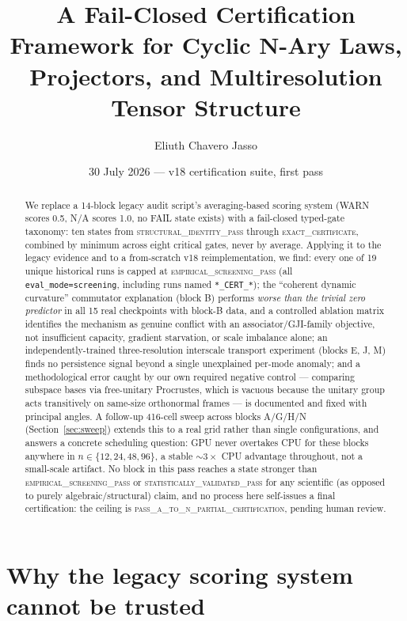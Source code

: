 \documentclass[11pt]{amsart}
\title[A Fail-Closed Certification Framework for Cyclic N-Ary Laws]{A Fail-Closed Certification Framework for Cyclic N-Ary Laws, Projectors, and Multiresolution Tensor Structure}
\author{Eliuth Chavero Jasso}
\date{30 July 2026 --- v18 certification suite, first pass}
\begin{document}
\begin{abstract}
We replace a 14-block legacy audit script's averaging-based scoring system
(WARN scores 0.5, N/A scores 1.0, no FAIL state exists) with a fail-closed
typed-gate taxonomy: ten states from \textsc{structural\_identity\_pass}
through \textsc{exact\_certificate}, combined by minimum across eight
critical gates, never by average. Applying it to the legacy evidence and
to a from-scratch v18 reimplementation, we find: every one of 19 unique
historical runs is capped at \textsc{empirical\_screening\_pass} (all
\texttt{eval\_mode=screening}, including runs named \texttt{*\_CERT\_*});
the ``coherent dynamic curvature'' commutator explanation (block B)
performs \emph{worse than the trivial zero predictor} in all 15 real
checkpoints with block-B data, and a controlled ablation matrix identifies
the mechanism as genuine conflict with an associator/GJI-family objective,
not insufficient capacity, gradient starvation, or scale imbalance alone;
an independently-trained three-resolution interscale transport experiment
(blocks E, J, M) finds no persistence signal beyond a single unexplained
per-mode anomaly; and a methodological error caught by our own required
negative control --- comparing subspace bases via free-unitary Procrustes,
which is vacuous because the unitary group acts transitively on
same-size orthonormal frames --- is documented and fixed with principal
angles. A follow-up 416-cell sweep across blocks A/G/H/N (Section~\ref{sec:sweep})
extends this to a real grid rather than single configurations, and answers
a concrete scheduling question: GPU never overtakes CPU for these blocks
anywhere in $n\in\{12,24,48,96\}$, a stable $\sim 3\times$ CPU advantage
throughout, not a small-scale artifact. No block in this pass reaches a state stronger than
\textsc{empirical\_screening\_pass} or \textsc{statistically\_validated\_pass}
for any scientific (as opposed to purely algebraic/structural) claim, and
no process here self-issues a final certification: the ceiling is
\textsc{pass\_a\_to\_n\_partial\_certification}, pending human review.
\end{abstract}

\maketitle

\section{Why the legacy scoring system cannot be trusted}
\label{sec:legacy}
\end{document}

